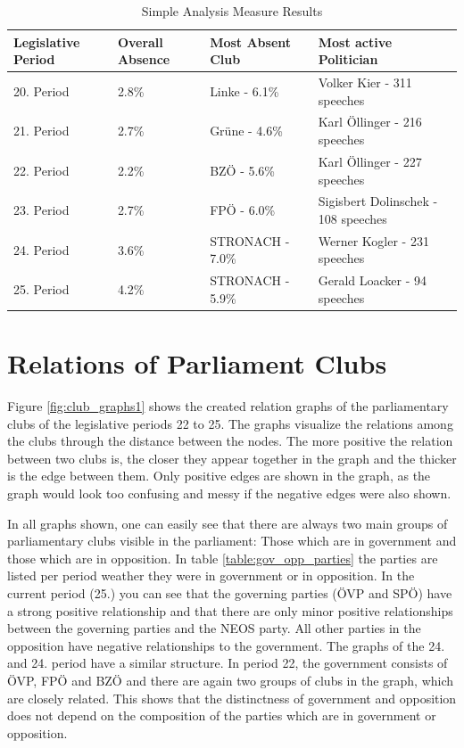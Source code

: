\begin{table}

\centering
\bgroup
\def\arraystretch{1.2}
\begin{tabular}{| p{2cm} | p{2cm} | p{3.5cm} | p{4cm} |}
\hline
  Legislative Period & Overall Absence & Most Absent Club & Most active Politician  \\
\hline
\hline
  20. Period & 2.8\% & Linke - 6.1\% & Volker Kier - 311 speeches \\
\hline
  21. Period & 2.7\% & Grüne - 4.6\% & Karl Öllinger - 216 speeches \\
\hline
  22. Period & 2.2\% & BZÖ - 5.6\% & Karl Öllinger - 227 speeches \\
\hline
  23. Period & 2.7\% & FPÖ - 6.0\% & Sigisbert Dolinschek - 108 speeches \\
\hline
  24. Period & 3.6\% & STRONACH - 7.0\% & Werner Kogler - 231 speeches \\
\hline
  25. Period & 4.2\% & STRONACH - 5.9\% & Gerald Loacker - 94 speeches \\
\hline

\end{tabular}
\egroup

\caption{Simple Analysis Measure Results}
\label{tab:simple_analysis_results}
\end{table}

\section{Relations of Parliament Clubs}
\label{sec:relations_clubs}
Figure \ref{fig:club_graphs1} shows the created relation graphs of the parliamentary clubs of the legislative periods 22 to 25. The graphs visualize the relations among the clubs through the distance between the nodes. The more positive the relation between two clubs is, the closer they appear together in the graph and the thicker is the edge between them. Only positive edges are shown in the graph, as the graph would look too confusing and messy if the negative edges were also shown. 

In all graphs shown, one can easily see that there are always two main groups of parliamentary clubs visible in the parliament: Those which are in government and those which are in opposition. In table \ref{table:gov_opp_parties} the parties are listed per period weather they were in government or in opposition. 
In the current period (25.) you can see that the governing parties (ÖVP and SPÖ) have a strong positive relationship and that there are only minor positive relationships between the governing parties and the NEOS party. All other parties in the opposition have negative relationships to the government. The graphs of the 24. and 24. period have a similar structure. In period 22, the government consists of ÖVP, FPÖ and BZÖ and there are again two groups of clubs in the graph, which are closely related. This shows that the distinctness of government and opposition does not depend on the composition of the parties which are in government or opposition.  


